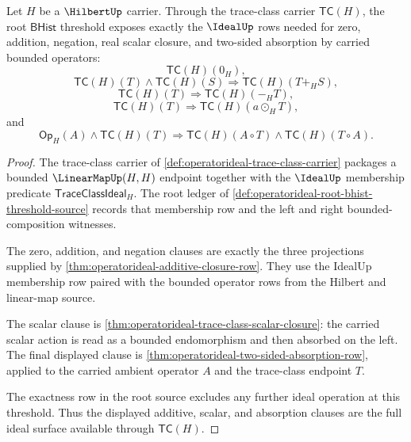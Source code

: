 \begin{theorem}
\label{thm:operatorideal-root-bhist-ideal-absorption-threshold}
Let $H$ be a $\HilbertUp$ carrier. Through the trace-class carrier $\mathsf{TC}(H)$, the root $\mathsf{BHist}$ threshold exposes exactly the $\IdealUp$ rows needed for zero, addition, negation, real scalar closure, and two-sided absorption by carried bounded operators:
$$
\mathsf{TC}(H)(0_H),
$$
$$
\mathsf{TC}(H)(T)\land\mathsf{TC}(H)(S)\Longrightarrow \mathsf{TC}(H)(T+_H S),
$$
$$
\mathsf{TC}(H)(T)\Longrightarrow \mathsf{TC}(H)(-_H T),
$$
$$
\mathsf{TC}(H)(T)\Longrightarrow\mathsf{TC}(H)(a\odot_H T),
$$
and
$$
\mathsf{Op}_H(A)\land\mathsf{TC}(H)(T)
\Longrightarrow
\mathsf{TC}(H)(A\circ T)\land\mathsf{TC}(H)(T\circ A).
$$
\end{theorem}
\begin{proof}
The trace-class carrier of \autoref{def:operatorideal-trace-class-carrier} packages a bounded $\LinearMapUp(H,H)$ endpoint together with the $\IdealUp$ membership predicate $\mathsf{TraceClassIdeal}_H$. The root ledger of \autoref{def:operatorideal-root-bhist-threshold-source} records that membership row and the left and right bounded-composition witnesses.

The zero, addition, and negation clauses are exactly the three projections supplied by \autoref{thm:operatorideal-additive-closure-row}. They use the IdealUp membership row paired with the bounded operator rows from the Hilbert and linear-map source.

The scalar clause is \autoref{thm:operatorideal-trace-class-scalar-closure}: the carried scalar action is read as a bounded endomorphism and then absorbed on the left. The final displayed clause is \autoref{thm:operatorideal-two-sided-absorption-row}, applied to the carried ambient operator $A$ and the trace-class endpoint $T$.

The exactness row in the root source excludes any further ideal operation at this threshold. Thus the displayed additive, scalar, and absorption clauses are the full ideal surface available through $\mathsf{TC}(H)$.
\end{proof}

